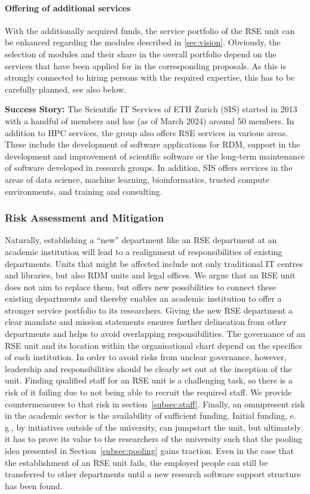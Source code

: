 \documentclass[a4paper]{article}
\newcommand*{\eg}{e.\,g.,\xspace}
\begin{document}
\paragraph{Offering of additional services}
With the additionally acquired funds, the service portfolio of the RSE unit can be enhanced regarding the modules described in \autoref{sec:vision}.
Obviously, the selection of modules and their share in the overall portfolio depend on the services that have been applied for in the corresponding proposals.
As this is strongly connected to hiring persons with the required expertise, this has to be carefully planned, see also below.

\begin{mdframed}
\textbf{Success Story:} The Scientific IT Services of ETH Zurich (SIS) started in 2013 with a handful of members and has (as of March 2024) around 50 members.
In addition to HPC services, the group also offers RSE services in various areas.
These include the development of software applications for RDM, support in the development and improvement of scientific software or the long-term maintenance of software developed in research groups.
In addition, SIS offers services in the areas of data science, machine learning, bioinformatics, trusted compute environments, and training and consulting.
\end{mdframed}

\subsubsection{Risk Assessment and Mitigation}
Naturally, establishing a “new” department like an RSE department at an academic institution will lead to a realignment of responsibilities of existing departments.
Units that might be affected include not only traditional IT centres and libraries, but also RDM units and legal offices.
We argue that an RSE unit does not aim to replace them, but offers new possibilities to connect these existing departments and thereby enables an academic institution to offer a stronger service portfolio to its researchers.
Giving the new RSE department a clear mandate and mission statements ensures further delineation from other departments and helps to avoid overlapping responsibilities.
The governance of an RSE unit and its location within the organisational chart depend on the specifics of each institution.
In order to avoid risks from unclear governance, however, leadership and responsibilities should be clearly set out at the inception of the unit.
Finding qualified staff for an RSE unit is a challenging task, so there is a risk of it failing due to not being able to recruit the required staff.
We provide countermeasures to that risk in section~\ref{subsec:staff}.
Finally, an omnipresent risk in the academic sector is the availability of sufficient funding. 
Initial funding, \eg{} by initiatives outside of the university, can jumpstart the unit, but ultimately it has to prove its value to the researchers of the university such that the pooling idea presented in Section~\ref{subsec:pooling} gains traction.
Even in the case that the establishment of an RSE unit fails, the employed people can still be transferred to other departments until a new research software support structure has been found.
\end{document}
